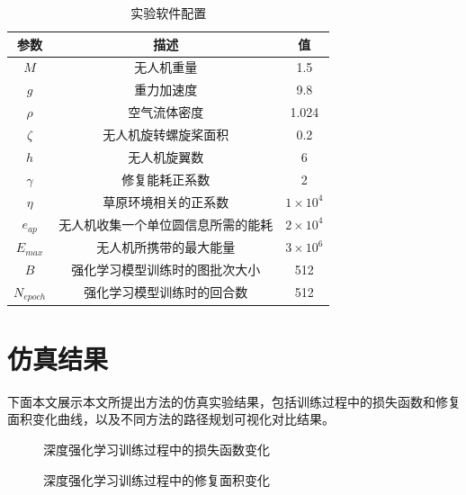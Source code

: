 \documentclass[AutoFakeBold]{LZUThesis}
\begin{document}
\label{sub:无人机参数表格}
\begin{table}[htbp]
	\centering
	\caption{实验软件配置}
	\setlength{\tabcolsep}{18pt}
	\begin{tabular}{ccc}
		\toprule
		参数              & 描述                & 值                   \\
		\midrule
		\( M \)         & 无人机重量             & 1.5                 \\
		\( g \)         & 重力加速度             & 9.8                 \\
		\( \rho \)      & 空气流体密度            & 1.024               \\
		\( \zeta \)     & 无人机旋转螺旋桨面积        & 0.2                 \\
		\( h \)         & 无人机旋翼数            & 6                   \\
		\( \gamma \)    & 修复能耗正系数           & 2                   \\
		\( \eta \)      & 草原环境相关的正系数        & \( 1 \times 10^4 \) \\
		\( e_{ap} \)    & 无人机收集一个单位圆信息所需的能耗 & \( 2 \times 10^4 \) \\
		\( E_{max} \)   & 无人机所携带的最大能量       & \( 3 \times 10^6 \) \\
		\( B \)         & 强化学习模型训练时的图批次大小   & 512                 \\
		\( N_{epoch} \) & 强化学习模型训练时的回合数     & 512                 \\
		\bottomrule
	\end{tabular}
	\label{tbl_drone_parameters}
\end{table}

\section{仿真结果}

下面本文展示本文所提出方法的仿真实验结果，包括训练过程中的损失函数和修复面积变化曲线，以及不同方法的路径规划可视化对比结果。

\begin{figure}[H]
	\centering
	
	\caption{深度强化学习训练过程中的损失函数变化}
	\label{fig:training_loss_curve}
\end{figure}

\begin{figure}[H]
	\centering
	
	\caption{深度强化学习训练过程中的修复面积变化}
	\label{fig:training_reward_curve}
\end{figure}
\end{document}
